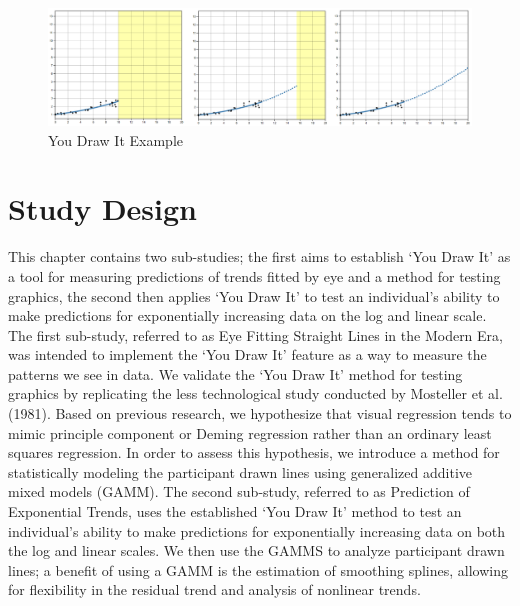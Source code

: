 \documentclass[print]{nuthesis}
\begin{document}
\begin{figure}[tbp]

{\centering \includegraphics[width=1\linewidth,]{images/02-you-draw-it/ydiExample-0.10-10-linear} 

}

\caption{You Draw It Example}\label{fig:youdrawit-example}
\end{figure}

\hypertarget{study-design-1}{%
\section{Study Design}\label{study-design-1}}

This chapter contains two sub-studies; the first aims to establish `You Draw It' as a tool for measuring predictions of trends fitted by eye and a method for testing graphics, the second then applies `You Draw It' to test an individual's ability to make predictions for exponentially increasing data on the log and linear scale.
The first sub-study, referred to as Eye Fitting Straight Lines in the Modern Era, was intended to implement the `You Draw It' feature as a way to measure the patterns we see in data. We validate the `You Draw It' method for testing graphics by replicating the less technological study conducted by Mosteller et al. (1981).
Based on previous research, we hypothesize that visual regression tends to mimic principle component or Deming regression rather than an ordinary least squares regression.
In order to assess this hypothesis, we introduce a method for statistically modeling the participant drawn lines using generalized additive mixed models (GAMM).
The second sub-study, referred to as Prediction of Exponential Trends, uses the established `You Draw It' method to test an individual's ability to make predictions for exponentially increasing data on both the log and linear scales.
We then use the GAMMS to analyze participant drawn lines; a benefit of using a GAMM is the estimation of smoothing splines, allowing for flexibility in the residual trend and analysis of nonlinear trends.
\end{document}
